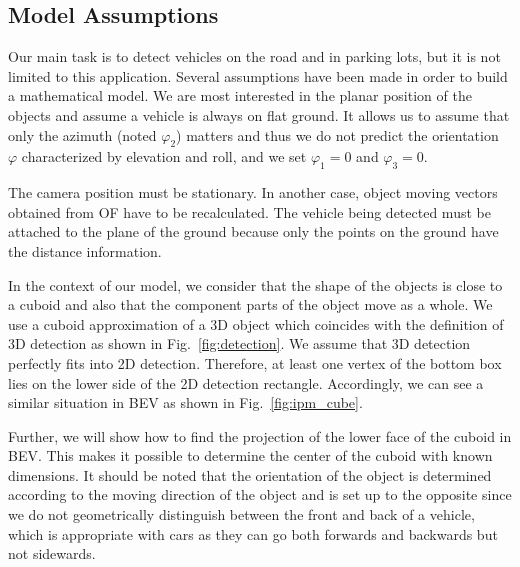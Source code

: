 \documentclass[graybox]{svmult}
\begin{document}
\subsection{Model Assumptions}
Our main task is to detect vehicles on the road and in parking lots, but it is not limited to this application.
Several assumptions have been made in order to build a mathematical model. 
We are most interested in the planar position of the objects and  assume a
vehicle is always on flat ground. %
It allows us to assume that only the azimuth (noted ${\varphi}_2$) matters and thus we do not predict the orientation $\varphi$ characterized by  elevation and roll, and we set ${\varphi}_1 = 0$ and ${\varphi}_3 = 0$.

The camera position must be stationary. In another case, object moving vectors obtained from OF have to be recalculated.
The vehicle being detected must be attached to the plane of the ground because only the points on the ground have the distance information.  




In the context of our model, we consider that the shape of the objects is close to a cuboid  and also that the component parts of the object move as a whole. We use a cuboid approximation of a 3D object which coincides with the definition of 3D detection as shown in Fig.~\ref{fig:detection}.
We assume that 3D detection perfectly fits into 2D detection. Therefore, at least one vertex of the bottom box  lies on the lower side of the 2D detection rectangle. Accordingly, we can see a similar situation in BEV as shown in Fig.~\ref{fig:ipm_cube}.



Further, we will show how to find the projection of the lower face of the cuboid in  BEV.
This makes it possible to determine the center of the cuboid with known dimensions. It should be noted that the orientation of the object is determined according to the moving direction of the object and is set up to the opposite since we do not geometrically distinguish between the front and back of a vehicle, which is appropriate with cars as they can go both forwards and backwards but not sidewards.
\end{document}

